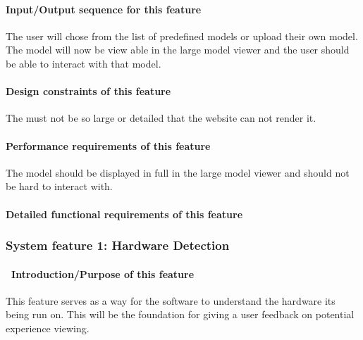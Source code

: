 \documentclass[letterpaper, 10pt, draftclsnofoot, onecolumn]{IEEEtran}
\begin{document}
{\paragraph[Input/Output sequence for this
feature]{\rmfamily\bfseries\color{black}
Input/Output sequence for this feature}
{\color{black}
The user will chose from the list of predefined models or upload their own model. The model will now be view able in the large model viewer and
the user should be able to interact with that model. }

\paragraph[Design constraints of this
feature]{\rmfamily\bfseries\color{black} Design
constraints of this feature}
{\color{black}
The must not be so large or detailed that the website can not render it. }

\paragraph[Performance requirements of this
feature]{\rmfamily\bfseries\color{black}
Performance requirements of this feature}
{\color{black}
The model should be displayed in full in the large model viewer and should not be hard to interact with. }

\paragraph[Detailed functional requirements of this
feature]{\rmfamily\bfseries\color{black}
Detailed functional requirements of this feature}



\subsubsection[{Hardware Detection}]{\rmfamily\bfseries\color{black} System
feature 1: Hardware Detection}
\paragraph[\ Introduction/Purpose of this
feature]{\foreignlanguage{english}{\ }\foreignlanguage{english}{Introduction/Purpose
of this feature}}
{\color{black}
This feature serves as a way for the software to understand the hardware its being run on. This will be the foundation for giving a user feedback on potential experience viewing. }

}
\end{document}
